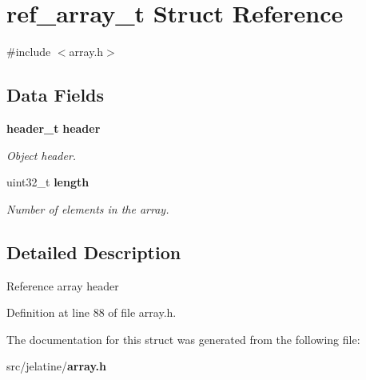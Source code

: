 \section{ref\_\-array\_\-t Struct Reference}
\label{structref__array__t}


{\ttfamily \#include $<$array.h$>$}

\subsection*{Data Fields}
\begin{DoxyCompactItemize}
\item 
{\bf header\_\-t} {\bf header}\label{structref__array__t_a8ea28089d47cd708efb25e0b700233ca}

\begin{DoxyCompactList}\small\item\em Object header. \item\end{DoxyCompactList}\item 
uint32\_\-t {\bf length}\label{structref__array__t_aaa4dfd5c51fadb902130c1728b1f7308}

\begin{DoxyCompactList}\small\item\em Number of elements in the array. \item\end{DoxyCompactList}\end{DoxyCompactItemize}


\subsection{Detailed Description}
Reference array header 

Definition at line 88 of file array.h.



The documentation for this struct was generated from the following file:\begin{DoxyCompactItemize}
\item 
src/jelatine/{\bf array.h}\end{DoxyCompactItemize}
